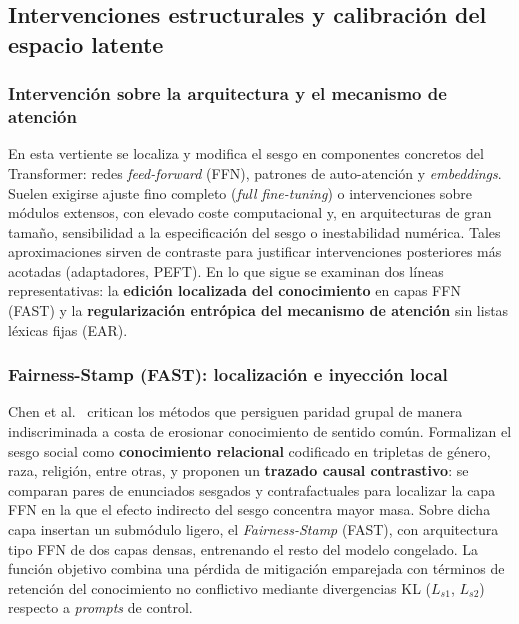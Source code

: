 \documentclass[12pt,a4paper]{report}
\begin{document}
\subsection{Intervenciones estructurales y calibración del espacio latente}
\label{subsec:sintesis_intervenciones_estructurales}

\subsubsection{Intervención sobre la arquitectura y el mecanismo de atención}

En esta vertiente se localiza y modifica el sesgo en componentes concretos del Transformer: redes \textit{feed-forward} (FFN), patrones de auto-atención y \textit{embeddings}. Suelen exigirse ajuste fino completo (\textit{full fine-tuning}) o intervenciones sobre módulos extensos, con elevado coste computacional y, en arquitecturas de gran tamaño, sensibilidad a la especificación del sesgo o inestabilidad numérica. Tales aproximaciones sirven de contraste para justificar intervenciones posteriores más acotadas (adaptadores, PEFT). En lo que sigue se examinan dos líneas representativas: la \textbf{edición localizada del conocimiento} en capas FFN (FAST) y la \textbf{regularización entrópica del mecanismo de atención} sin listas léxicas fijas (EAR).

\subsubsection{Fairness-Stamp (FAST): localización e inyección local}

Chen et al.\ \cite{chen_identifying_2025} critican los métodos que persiguen paridad grupal de manera indiscriminada a costa de erosionar conocimiento de sentido común. Formalizan el sesgo social como \textbf{conocimiento relacional} codificado en tripletas de género, raza, religión, entre otras, y proponen un \textbf{trazado causal contrastivo}: se comparan pares de enunciados sesgados y contrafactuales para localizar la capa FFN en la que el efecto indirecto del sesgo concentra mayor masa. Sobre dicha capa insertan un submódulo ligero, el \textit{Fairness-Stamp} (FAST), con arquitectura tipo FFN de dos capas densas, entrenando el resto del modelo congelado. La función objetivo combina una pérdida de mitigación emparejada con términos de retención del conocimiento no conflictivo mediante divergencias KL (\(L_{s1}\), \(L_{s2}\)) respecto a \textit{prompts} de control.
\end{document}
